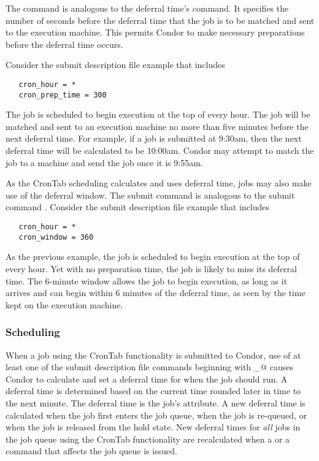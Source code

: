 The  command
is analogous to the deferral time's  command. 
It specifies the number of seconds before the deferral time
that the job is to be matched and sent to the execution machine. 
This permits Condor to
make necessary preparations before the deferral time occurs. 

Consider the submit description file example that includes 
\begin{verbatim}
   cron_hour = *
   cron_prep_time = 300
\end{verbatim}
The job is scheduled to begin execution at the top of every hour.
The job will be matched and sent to an execution machine 
no more than five minutes before the next deferral time. 
For example, if a job is submitted at 9:30am, then the 
next deferral time will be calculated to be 10:00am.
Condor may attempt to match the job to a machine and send the job
once it is 9:55am.

As the CronTab scheduling calculates and uses deferral time,
jobs may also make use of the deferral window.
The submit command  is analogous to
the submit command .
Consider the submit description file example that includes 
\begin{verbatim}
   cron_hour = *
   cron_window = 360
\end{verbatim}
As the previous example, the job is scheduled to begin execution
at the top of every hour.
Yet with no preparation time, the job is likely to miss
its deferral time.
The 6-minute window allows the job to begin execution,
as long as it arrives and can begin within 6 minutes of
the deferral time,
as seen by the time kept on the execution machine.

\subsubsection{Scheduling}
\label{sec:crontab-scheduling}

When a job using the CronTab functionality is submitted to Condor, 
use of at least one of the submit description file commands
beginning with \verb@cron_@ causes Condor
to calculate and set a deferral time for when the job should run. 
A deferral time is determined based on the current time 
rounded later in time to the next minute. 
The deferral time is the job's  attribute. 
A new deferral time is calculated when the job 
first enters the job queue, when 
the job is re-queued, or when the job is released from the hold state. 
New deferral times for \emph{all} jobs in the job queue 
using the CronTab functionality are recalculated 
when a  or a  command that
affects the job queue is issued.

